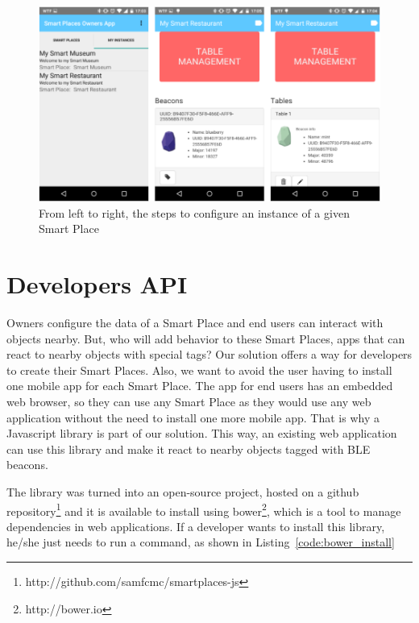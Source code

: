 \begin{figure}[!ht]
  \centering
    \includegraphics[width=1\textwidth, keepaspectratio]{images/screenshots/ownersapp_configure}
    \caption[Configure a Smart Place Instance]{From left to right, the steps to configure an instance of a given Smart Place}
    \label{fig:screenshot_ownersapp_configure}
\end{figure}

\section{Developers API}
\label{sec:solution_developers_api}
Owners configure the data of a Smart Place and end users can interact with objects nearby.
But, who will add behavior to these Smart Places, apps that can react to nearby objects with special tags?
Our solution offers a way for developers to create their Smart Places.
Also, we want to avoid the user having to install one mobile app for each Smart Place.
The app for end users has an embedded web browser, so they can use any Smart Place as they would use any web application without the need to install one more mobile app.
That is why a Javascript library is part of our solution.
This way, an existing web application can use this library and make it react to nearby objects tagged with \gls{BLE} beacons.

The library was turned into an open-source project, hosted on a github repository\footnote{http://github.com/samfcmc/smartplaces-js} and it is available to install using bower\footnote{http://bower.io}, which is a tool to manage dependencies in web applications.
If a developer wants to install this library, he/she just needs to run a command, as shown in Listing~\ref{code:bower_install}

